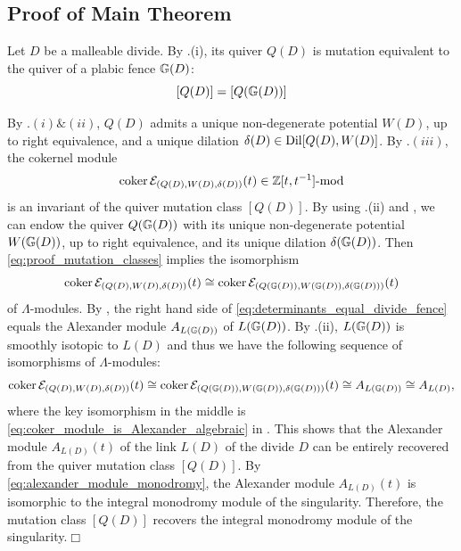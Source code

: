 \subsection{Proof of Main Theorem} Let $D$ be a malleable divide. By .(i), its quiver $Q(D)$ is mutation equivalent to the quiver of a plabic fence $\mathbb G(D)$:
\begin{equation}\label{eq:proof_mutation_classes}
[Q(D)]=[Q(\mathbb G(D))]
\end{equation}

By .$(i)\&(ii)$, $Q(D)$ admits a unique non-degenerate potential $W(D)$, up to right equivalence, and a unique dilation $\delta(D)\in\operatorname{Dil}[Q(D),W(D)]$. By .$(iii)$, the cokernel module
    $$\operatorname{coker}\mathcal E_{(Q(D),W(D),\delta(D))}(t)\in\mathbb Z[t,t^{-1}]\mbox{-mod}$$
    is an invariant of the quiver mutation class $[Q(D)]$. By using .(ii) and , we can endow the quiver $Q(\mathbb G(D))$ with its unique non-degenerate potential $W(\mathbb G(D))$, up to right equivalence, and its unique dilation $\delta(\mathbb G(D))$. Then \eqref{eq:proof_mutation_classes} implies the isomorphism
    \begin{equation}\label{eq:determinants_equal_divide_fence}
    \operatorname{coker}\mathcal E_{(Q(D),W(D),\delta(D))}(t)\cong\operatorname{coker}\mathcal E_{(Q(\mathbb G(D)),W(\mathbb G(D)),\delta(\mathbb G(D)))}(t)
    \end{equation}
    of $\Lambda$-modules. By , the right hand side of \eqref{eq:determinants_equal_divide_fence} equals the Alexander module $A_{L(\mathbb G(D))}$ of $L(\mathbb G(D))$. By .(ii), $L(\mathbb G(D))$ is smoothly isotopic to $L(D)$ and thus we have the following sequence of isomorphisms of $\Lambda$-modules:
    $$\operatorname{coker}\mathcal E_{(Q(D),W(D),\delta(D))}(t)\cong\operatorname{coker}\mathcal E_{(Q(\mathbb G(D)),W(\mathbb G(D)),\delta(\mathbb G(D)))}(t)\cong A_{L(\mathbb G(D))}\cong A_{L(D)},$$
    where the key isomorphism in the middle is \eqref{eq:coker_module_is_Alexander_algebraic} in . This shows that the Alexander module $A_{L(D)}(t)$ of the link $L(D)$ of the divide $D$ can be entirely recovered from the quiver mutation class $[Q(D)]$. By \eqref{eq:alexander_module_monodromy}, the Alexander module $A_{L(D)}(t)$ is isomorphic to the integral monodromy module of the singularity. Therefore, the mutation class $[Q(D)]$ recovers the integral monodromy module of the singularity.\hfill$\Box$
    
